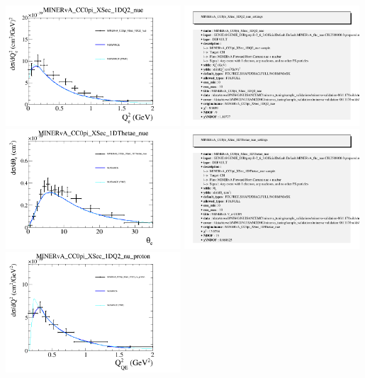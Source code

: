 \documentclass{article}
\begin{document}
\centering
\includegraphics[width=0.49\textwidth]{figures/nuisance_MINERvA_CC0pi_XSec_1DQ2_nue_comp.png}
\includegraphics[width=0.49\textwidth]{figures/nuisance_MINERvA_CC0pi_XSec_1DQ2_nue_info.png}
\centering
\includegraphics[width=0.49\textwidth]{figures/nuisance_MINERvA_CC0pi_XSec_1DThetae_nue_comp.png}
\includegraphics[width=0.49\textwidth]{figures/nuisance_MINERvA_CC0pi_XSec_1DThetae_nue_info.png}
\centering
\includegraphics[width=0.49\textwidth]{figures/nuisance_MINERvA_CC0pi_XSec_1DQ2_nu_proton_comp.png}
\end{document}
